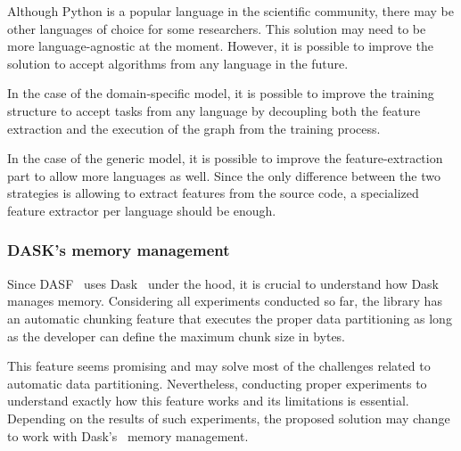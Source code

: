 Although Python is a popular language in the scientific community, there may be other languages of choice for some researchers.
This solution may need to be more language-agnostic at the moment.
However, it is possible to improve the solution to accept algorithms from any language in the future.

In the case of the domain-specific model, it is possible to improve the training structure to accept tasks from any language by decoupling both the feature extraction and the execution of the graph from the training process.

In the case of the generic model, it is possible to improve the feature-extraction part to allow more languages as well.
Since the only difference between the two strategies is allowing to extract features from the source code, a specialized feature extractor per language should be enough.

\subsubsection{DASK's memory management}

Since \ac{DASF}~\cite{dasf} uses Dask~\cite{dask} under the hood, it is crucial to understand how Dask~\cite{dask} manages memory.
Considering all experiments conducted so far, the library has an automatic chunking feature that executes the proper data partitioning as long as the developer can define the maximum chunk size in bytes.

This feature seems promising and may solve most of the challenges related to automatic data partitioning.
Nevertheless, conducting proper experiments to understand exactly how this feature works and its limitations is essential.
Depending on the results of such experiments, the proposed solution may change to work with Dask's~\cite{dask} memory management.
